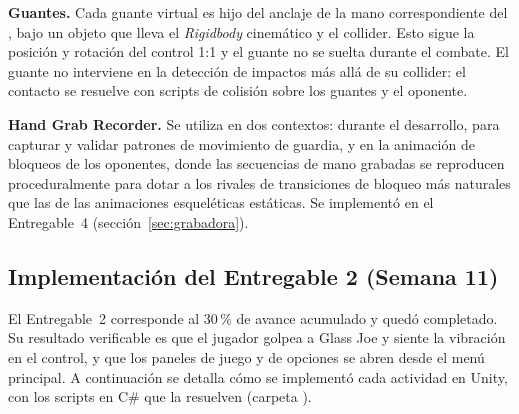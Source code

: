 \textbf{Guantes.} Cada guante virtual es hijo del anclaje de la mano correspondiente del , bajo un objeto  que lleva el \emph{Rigidbody} cinemático y el collider. Esto sigue la posición y rotación del control 1:1 y el guante no se suelta durante el combate. El guante no interviene en la detección de impactos más allá de su collider: el contacto se resuelve con scripts de colisión sobre los guantes y el oponente.

\textbf{Hand Grab Recorder.} Se utiliza en dos contextos: durante el desarrollo, para capturar y validar patrones de movimiento de guardia, y en la animación de bloqueos de los oponentes, donde las secuencias de mano grabadas se reproducen proceduralmente para dotar a los rivales de transiciones de bloqueo más naturales que las de las animaciones esqueléticas estáticas. Se implementó en el Entregable~4 (sección~\ref{sec:grabadora}).

\subsection{Implementación del Entregable 2 (Semana 11)}
El Entregable~2 corresponde al 30\,\% de avance acumulado y quedó completado. Su resultado verificable es que el jugador golpea a Glass Joe y siente la vibración en el control, y que los paneles de juego y de opciones se abren desde el menú principal. A continuación se detalla cómo se implementó cada actividad en Unity, con los scripts en C\# que la resuelven (carpeta ).


